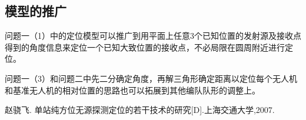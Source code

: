 \documentclass{ctexart}
\begin{document}
\subsection{模型的推广}
    问题一（1）中的定位模型可以推广到用平面上任意3个已知位置的发射源及接收点得到的角度信息来定位一个已知大致位置的接收点，不必局限在圆周附近进行定位。

    问题一（3）和问题二中先二分确定角度，再解三角形确定距离以定位每个无人机和基准无人机的相对位置的思路也可以拓展到其他编队队形的调整上。

    

\begin{thebibliography}{100}%
   赵骁飞. 单站纯方位无源探测定位的若干技术的研究[D].上海交通大学,2007.
\end{thebibliography}
\end{document}
